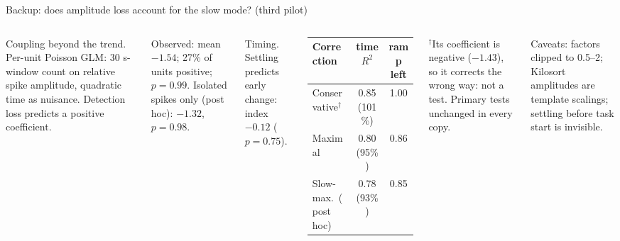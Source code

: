 \documentclass[aspectratio=169,11pt]{beamer}
\newcommand{\muted}[1]{{\color{cInk}#1}}
\newcommand{\Rsq}{$R^2$}
\begin{document}
\begin{frame}{Backup: does amplitude loss account for the slow mode? (third pilot)}
\begin{columns}[T,onlytextwidth]
\small
Coupling beyond the trend. Per-unit Poisson GLM: 30 s-window count on relative spike amplitude, quadratic
time as nuisance. Detection loss predicts a positive coefficient.

\medskip
Observed: mean $-1.54$; 27\% of units positive; $p = 0.99$.
Isolated spikes only (post hoc): $-1.32$, $p = 0.98$.

\medskip
Timing. Settling predicts early change: index $-0.12$ ($p = 0.75$).

\small
\setlength{\tabcolsep}{4pt}
\begin{tabular}{@{}lcc@{}}
\toprule
Correction & time \Rsq{} & ramp left \\
\midrule
Conservative$^\dagger$ & 0.85 (101\%) & 1.00 \\
Maximal & 0.80 (95\%) & 0.86 \\
Slow-max.\ (post hoc) & 0.78 (93\%) & 0.85 \\
\bottomrule
\end{tabular}

\medskip
$^\dagger$Its coefficient is negative ($-1.43$), so it corrects the wrong way: not a test. Primary tests unchanged in
every copy.

\medskip
\muted{Caveats: factors clipped to 0.5--2; Kilosort amplitudes are template scalings; settling before task
start is invisible.}
\end{columns}
\end{frame}
\end{document}
